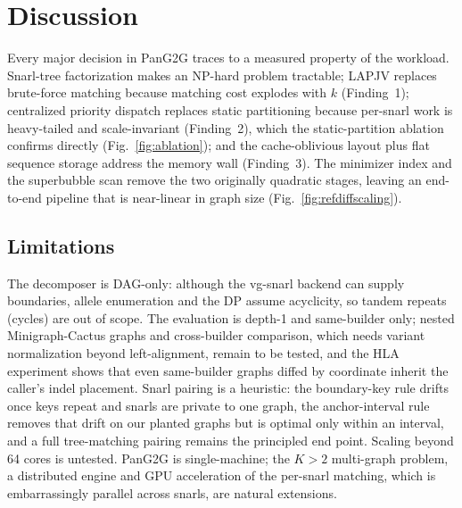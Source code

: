 \section{Discussion}
\label{sec:discussion}

Every major decision in PanG2G traces to a measured property of the workload. Snarl-tree factorization makes an NP-hard problem tractable; LAPJV replaces brute-force matching because matching cost explodes with $k$ (Finding~1); centralized priority dispatch replaces static partitioning because per-snarl work is heavy-tailed and scale-invariant (Finding~2), which the static-partition ablation confirms directly (Fig.~\ref{fig:ablation}); and the cache-oblivious layout plus flat sequence storage address the memory wall (Finding~3). The minimizer index and the superbubble scan remove the two originally quadratic stages, leaving an end-to-end pipeline that is near-linear in graph size (Fig.~\ref{fig:refdiffscaling}).

\subsection{Limitations}
The decomposer is DAG-only: although the vg-snarl backend can supply boundaries, allele enumeration and the DP assume acyclicity, so tandem repeats (cycles) are out of scope. The evaluation is depth-1 and same-builder only; nested Minigraph-Cactus graphs and cross-builder comparison, which needs variant normalization beyond left-alignment, remain to be tested, and the HLA experiment shows that even same-builder graphs diffed by coordinate inherit the caller's indel placement. Snarl pairing is a heuristic: the boundary-key rule drifts once keys repeat and snarls are private to one graph, the anchor-interval rule removes that drift on our planted graphs but is optimal only within an interval, and a full tree-matching pairing remains the principled end point. Scaling beyond 64 cores is untested. PanG2G is single-machine; the $K>2$ multi-graph problem, a distributed engine and GPU acceleration of the per-snarl matching, which is embarrassingly parallel across snarls, are natural extensions.

